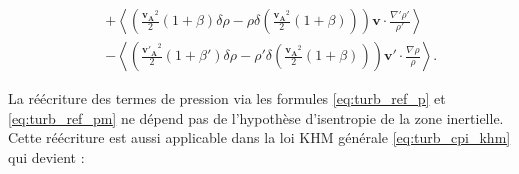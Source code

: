 \begin{equation}
{\begin{array}{lcl}
&&+  \left< \left(\frac{\boldsymbol{v_A}^2}{2} \left(1+\beta\right) \delta \rho - \rho \delta \left(\frac{\boldsymbol{v_A}^2}{2} \left(1+\beta\right)\right)  \right)\boldsymbol{v} \cdot \frac{\nabla' \rho'}{\rho'}\right>\\
&&- \left<\left(\frac{\boldsymbol{v'_A}^2}{2} \left(1+\beta'\right) \delta \rho - \rho' \delta \left(\frac{\boldsymbol{v_A}^2}{2} \left(1+\beta\right)\right)  \right)  \boldsymbol{v'} \cdot \frac{\nabla \rho}{\rho} \right> .
\end{array}}
\end{equation} 

La réécriture des termes de pression via les formules \eqref{eq:turb_ref_p} et \eqref{eq:turb_ref_pm} ne dépend pas de l'hypothèse d'isentropie de la zone inertielle. Cette réécriture est aussi applicable dans la loi \acs{KHM} générale \eqref{eq:turb_cpi_khm} qui devient :
